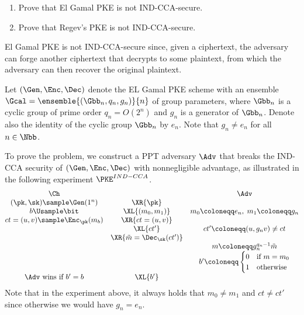 \begin{problem}\label{p5}
    \leavevmode\par
    \begin{enumerate}[label=(\roman*)]
        \item Prove that El Gamal PKE is not IND-CCA-secure.
        \item Prove that Regev's PKE is not IND-CCA-secure.
    \end{enumerate}
\end{problem}



\begin{answer}[i]
    \leavevmode\par
    \begin{intuition}
        El Gamal PKE is not IND-CCA-secure since, given a ciphertext, the adversary can forge another ciphertext that decrypts to some plaintext, from which the adversary can then recover the original plaintext.
    \end{intuition}

    Let $(\Gen, \Enc, \Dec)$ denote the EL Gamal PKE scheme with an ensemble  $\Gcal=\ensemble{(\Gbb_n, q_n, g_n)}{n}$ of group parameters, where $\Gbb_n$ is a cyclic group of prime order $q_n=O(2^n)$ and $g_n$ is a generator of $\Gbb_n$. Denote also the identity of the cyclic group $\Gbb_n$ by $e_n$. Note that $g_n\neq e_n$ for all $n\in\Nbb$.
    
    To prove the problem, we construct a PPT adversary $\Adv$ that breaks the IND-CCA security of  $(\Gen, \Enc, \Dec)$ with nonnegligible advantage, as illustrated in the following experiment $\PKE^{IND-CCA}$.
    {
        \[
            \begin{array}{@{} c c c @{}}
            \Ch & & \Adv \\
            (\pk, \sk)\sample \Gen(1^n) & \XR{\pk} &\\
            b\Usample\bit & \XL{(m_0, m_1)} & m_0\coloneqq e_n,\; m_1\coloneqq g_n \\
            ct=(u,v)\sample \Enc_{\pk}(m_b)  & \XR{ct=(u,v)} &\\
            & \XL{ct'} &  ct'\coloneqq (u, g_nv) \neq ct\\
            & \XR{\tilde{m}=\Dec_\sk(ct')} & \\
            && m\coloneqq g_n^{q_n-1}\tilde{m} \\
            & &  b'\coloneqq  \begin{cases}
                0 &\textrm{if } m= m_0\\
                1 &\textrm{otherwise}
            \end{cases}  \\
            \textrm{$\Adv$ wins if $b' = b$} & \XL{b'} \\
            \end{array}
        \]
        \label{fig:p5-game1}
    }
    \noindent Note that in the experiment above, it always holds that $m_0\neq m_1$ and $ct\neq ct'$ since otherwise we would have $g_n=e_n$.


\end{answer}
